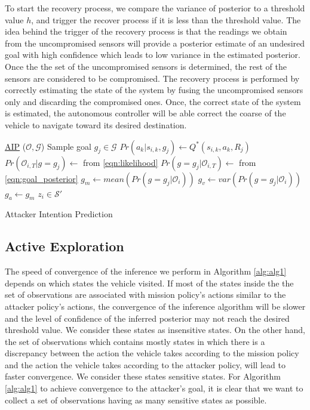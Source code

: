 \documentclass[letterpaper, 10 pt, conference]{ieeeconf}  %
\begin{document}
To start the recovery process, we compare the variance of posterior  to a threshold value $h$, and trigger the recover process if  it is less than the threshold value. The idea behind the trigger of the recovery process is that the readings we obtain from the uncompromised sensors will provide a posterior estimate of an undesired goal with high confidence which leads to low variance in the estimated posterior. Once the the set of the uncompromised sensors is determined, the rest of the sensors are considered to be compromised. The recovery process is performed by correctly estimating the state of the system by fusing the uncompromised sensors only and discarding the compromised ones. Once, the correct state of the system is estimated, the autonomous controller will be able correct the coarse of the vehicle to navigate toward its desired destination.
\begin{algorithm}\label{alg:alg1}
    \underline{AIP} ($\mathcal{O}, \mathcal{G}$)\;
    {
        {
            Sample goal $g_j \in \mathcal{G}$\;
            { 
                $Pr(a_k|s_{i,k},g_j) \leftarrow Q^*(s_{i,k},a_k,R_j)$\;
            }
            $Pr(\mathcal{O}_{i,T}|g=g_j) \leftarrow$  from \ref{eqn:likelihood}\;
            $Pr(g=g_j|\mathcal{O}_{i,T}) \leftarrow$ from \ref{eqn:goal_posterior}\;
        }
        $g_m \leftarrow mean(Pr(g=g_j|\mathcal{O}_i))$\;
        $g_v \leftarrow  var(Pr(g=g_j|\mathcal{O}_i))$\;
        {
            $g_a \leftarrow g_m$\;
            $z_i \in \mathcal{S}'$\;
        }
    }
    \caption{Attacker Intention Prediction}
\end{algorithm}

\subsection{Active Exploration}
The speed of convergence of the inference we perform in Algorithm \ref{alg:alg1} depends on which states the vehicle visited. If most of the states inside the the set of observations are associated with mission policy's actions similar to the attacker policy's actions, the convergence of the inference algorithm will be slower and the level of confidence of the inferred posterior may not reach the desired threshold value. We consider these states as insensitive states. On the other hand, the set of observations which contains mostly states in which there is a discrepancy between the action the vehicle takes according to the mission policy and the action the vehicle takes according to the attacker policy, will lead to faster convergence. We consider these states sensitive states. For Algorithm \ref{alg:alg1} to achieve convergence to the attacker's goal, it is clear that we want to collect a set of observations having as many sensitive states as possible.
\end{document}
